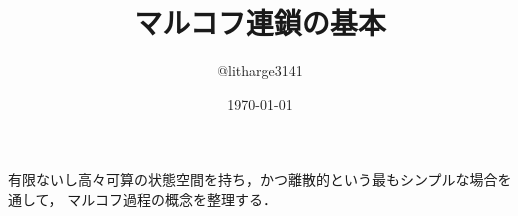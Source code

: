 \documentclass[dvipdfmx,autodetect-engine]{jsarticle}
\theoremstyle{remark}
\theoremstyle{definition}
\begin{document}
\title{マルコフ連鎖の基本}
\author{@litharge3141}
\date{\today}
\maketitle

\section{}
有限ないし高々可算の状態空間を持ち，かつ離散的という最もシンプルな場合を通して，
マルコフ過程の概念を整理する．
\subsection{}
\end{document}
